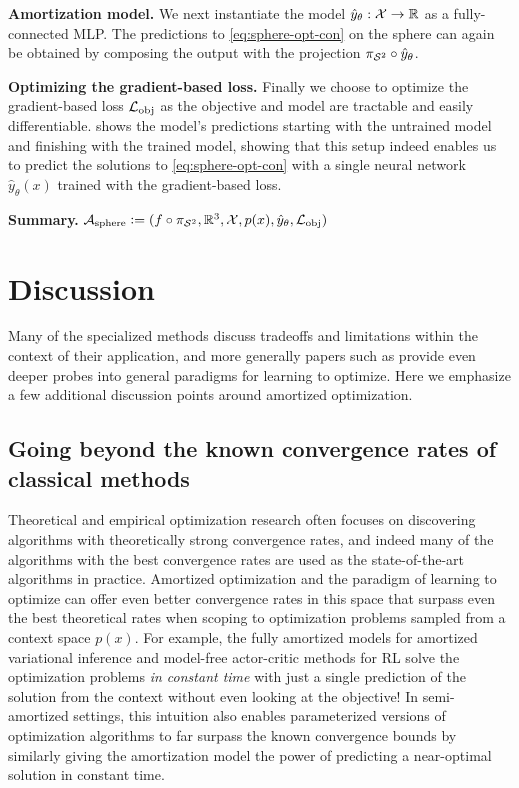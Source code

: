 \documentclass[twoside,11pt]{article}
\begin{document}
\textbf{Amortization model.}
We next instantiate the model
$\hat y_\theta: {\mathcal{X}}\rightarrow\mathbb{R}$
as a fully-connected MLP.
The predictions to \cref{eq:sphere-opt-con}
on the sphere can again be obtained by composing
the output with the projection
$\pi_{{\mathcal{S}}^2}\circ \hat y_\theta$.

\textbf{Optimizing the gradient-based loss.}
Finally we choose to optimize the gradient-based loss ${\mathcal{L}}_{\rm obj}$
as the objective and model are tractable and
easily differentiable.
 shows the model's predictions
starting with the untrained model and finishing
with the trained model, showing that this setup
indeed enables us to predict the solutions to
\cref{eq:sphere-opt-con} with a single neural network
$\hat y_\theta(x)$ trained with the gradient-based loss.

\textbf{Summary.}
${\mathcal{A}}_{\rm sphere}\vcentcolon= (f\circ \pi_{{\mathcal{S}}^2}, \mathbb{R}^3, {\mathcal{X}}, p(x), \hat y_\theta, {\mathcal{L}}_{\rm obj})$

\section{Discussion}
\label{sec:discussion}
Many of the specialized methods discuss tradeoffs and
limitations within the context of their application,
and more generally papers such as
\citet{chen2021learning,metz2021gradients}
provide even deeper probes into general paradigms for
learning to optimize.
Here we emphasize a few additional discussion points
around amortized optimization.

\subsection{Going beyond the known convergence rates of
  classical methods}
\label{sec:convergence}
Theoretical and empirical optimization research often focuses
on discovering algorithms with theoretically strong convergence
rates, and indeed many of the algorithms with the best convergence
rates are used as the state-of-the-art algorithms in practice.
Amortized optimization and the paradigm of learning to optimize
can offer even better convergence rates in this space that
surpass even the best theoretical rates when scoping to
optimization problems sampled from a context space $p(x)$.
For example, the fully amortized models for amortized variational
inference and model-free actor-critic methods for RL solve
the optimization problems \emph{in constant time} with just
a single prediction of the solution from the context without
even looking at the objective!
In semi-amortized settings, this intuition also enables
parameterized versions of optimization algorithms to far
surpass the known convergence bounds by similarly giving the
amortization model the power of predicting a near-optimal
solution in constant time.
\end{document}
